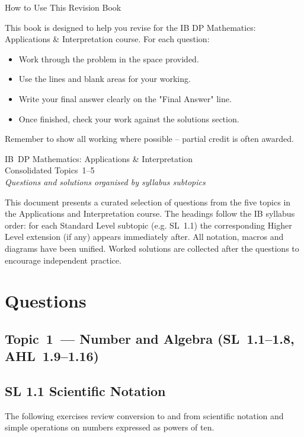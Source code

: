 \documentclass[11pt]{article}
\def\textbf#1{#1}%
\newcommand{\tocsection}[1]{\section{#1}}
\newcommand{\tocsubsection}[1]{\subsection{#1}}
\newcounter{question}
\newcommand{\EnableQuestionHeader}{%
  \fancyhead[L]{\large\textbf{Name: } \rule{6cm}{0.6pt}}%
  \fancyhead[R]{\large\textbf{Date: } \rule{4cm}{0.6pt}}%
}
\begin{document}
\begin{center}{\Large\textbf{How to Use This Revision Book}}\\\end{center}
\noindent This book is designed to help you revise for the IB DP Mathematics: Applications \& Interpretation course.
For each question:
\begin{itemize}
  \item Work through the problem in the space provided.
  \item Use the lines and blank areas for your working.
  \item Write your \textbf{final answer} clearly on the "Final Answer" line.
  \item Once finished, check your work against the solutions section.
\end{itemize}
\bigskip
\noindent Remember to show all working where possible -- partial credit is often awarded.
\newpage

\hypertarget{toc}{}%
\tableofcontents
\newpage
\EnableQuestionHeader 
\begin{center}
{\large\textbf{IB DP Mathematics: Applications \& Interpretation}}\\
\bigskip
{\Huge\textbf{Consolidated Topics 1–5}}\\
\medskip
\emph{Questions and solutions organised by syllabus subtopics}
\end{center}

\vspace{1em}
This document presents a curated selection of questions from the five topics
in the Applications and Interpretation course.  The headings follow the IB
syllabus order: for each Standard Level subtopic (e.g. SL 1.1) the
corresponding Higher Level extension (if any) appears immediately after.  All
notation, macros and diagrams have been unified.  Worked solutions are
collected after the questions to encourage independent practice.

\tocsection{Questions}

\tocsubsection{Topic 1 — Number and Algebra (SL 1.1–1.8, AHL 1.9–1.16)}


\tocsubsection{SL  1.1  \; Scientific  Notation}
The following exercises review conversion to and from scientific notation and
simple operations on numbers expressed as powers of ten.
\end{document}
